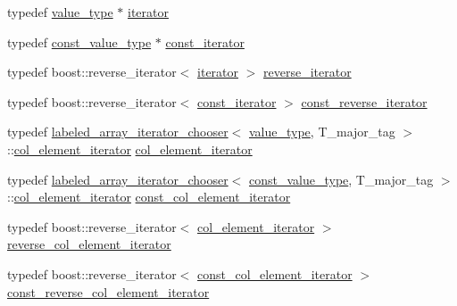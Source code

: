 \begin{DoxyCompactItemize}
typedef \hyperlink{classIceBRG_1_1labeled__array_a183002e8991647a6fbed8c13b64ff8f4}{value\+\_\+type} $\ast$ \hyperlink{classIceBRG_1_1labeled__array_a15c8011c5051008033578e5e50e25820}{iterator}
\item 
typedef \hyperlink{classIceBRG_1_1labeled__array_a4b9270762c39bd24b1f7855a7e21a63d}{const\+\_\+value\+\_\+type} $\ast$ \hyperlink{classIceBRG_1_1labeled__array_ae50c667e3ccb32675f43d38b9132a212}{const\+\_\+iterator}
\item 
typedef boost\+::reverse\+\_\+iterator$<$ \hyperlink{classIceBRG_1_1labeled__array_a15c8011c5051008033578e5e50e25820}{iterator} $>$ \hyperlink{classIceBRG_1_1labeled__array_a5125d18747cdbb29f32a4a46c97d348e}{reverse\+\_\+iterator}
\item 
typedef boost\+::reverse\+\_\+iterator$<$ \hyperlink{classIceBRG_1_1labeled__array_ae50c667e3ccb32675f43d38b9132a212}{const\+\_\+iterator} $>$ \hyperlink{classIceBRG_1_1labeled__array_a5088e7c1e054a6f2d6067664ee29fafb}{const\+\_\+reverse\+\_\+iterator}
\item 
typedef \hyperlink{namespaceIceBRG_structIceBRG_1_1labeled__array__iterator__chooser}{labeled\+\_\+array\+\_\+iterator\+\_\+chooser}$<$ \hyperlink{classIceBRG_1_1labeled__array_a183002e8991647a6fbed8c13b64ff8f4}{value\+\_\+type}, T\+\_\+major\+\_\+tag $>$\+::\hyperlink{classIceBRG_1_1labeled__array_a8f65ba678f8d25c85109d51dd522950d}{col\+\_\+element\+\_\+iterator} \hyperlink{classIceBRG_1_1labeled__array_a8f65ba678f8d25c85109d51dd522950d}{col\+\_\+element\+\_\+iterator}
\item 
typedef \hyperlink{namespaceIceBRG_structIceBRG_1_1labeled__array__iterator__chooser}{labeled\+\_\+array\+\_\+iterator\+\_\+chooser}$<$ \hyperlink{classIceBRG_1_1labeled__array_a4b9270762c39bd24b1f7855a7e21a63d}{const\+\_\+value\+\_\+type}, T\+\_\+major\+\_\+tag $>$\+::\hyperlink{classIceBRG_1_1labeled__array_a8f65ba678f8d25c85109d51dd522950d}{col\+\_\+element\+\_\+iterator} \hyperlink{classIceBRG_1_1labeled__array_a6f847eeeec0a510c85832e235923f374}{const\+\_\+col\+\_\+element\+\_\+iterator}
\item 
typedef boost\+::reverse\+\_\+iterator$<$ \hyperlink{classIceBRG_1_1labeled__array_a8f65ba678f8d25c85109d51dd522950d}{col\+\_\+element\+\_\+iterator} $>$ \hyperlink{classIceBRG_1_1labeled__array_aacd98fdd793a8e3e937485151d8ecf27}{reverse\+\_\+col\+\_\+element\+\_\+iterator}
\item 
typedef boost\+::reverse\+\_\+iterator$<$ \hyperlink{classIceBRG_1_1labeled__array_a6f847eeeec0a510c85832e235923f374}{const\+\_\+col\+\_\+element\+\_\+iterator} $>$ \hyperlink{classIceBRG_1_1labeled__array_a35c6fb77c743e26339b8bb8481861da9}{const\+\_\+reverse\+\_\+col\+\_\+element\+\_\+iterator}

\end{DoxyCompactItemize}
